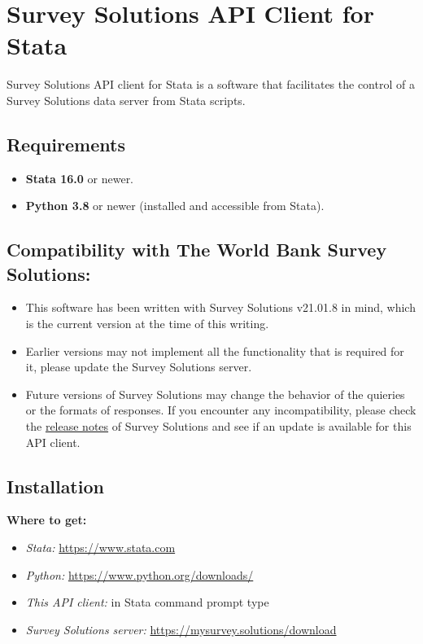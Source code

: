 \section{Survey Solutions API Client for Stata}

\vskip16pt
Survey Solutions API client for Stata is a software that facilitates the
control of a Survey Solutions data server from Stata scripts.

\vskip16pt
\subsection{Requirements}

\begin{itemize}
    \item \textbf{Stata 16.0} or newer.
    \item \textbf{Python 3.8} or newer (installed and accessible from Stata).
\end{itemize}

\vskip16pt
\subsection{Compatibility with The World Bank Survey Solutions:}
\begin{itemize}
  \item This software has been written with Survey Solutions v21.01.8 in mind,
        which is the current version at the time of this writing.
  \item Earlier versions may not implement all the functionality that is
        required for it, please update the Survey Solutions server.
  \item Future versions of Survey Solutions may change the behavior of the
        quieries or the formats of responses. If you encounter any
        incompatibility, please check the \href{https://docs.mysurvey.solutions/release_notes}{release notes} of Survey Solutions
        and see if an update is available for this API client.
\end{itemize}

\vskip16pt
\subsection{Installation}
\par
\vskip16pt
\textbf{Where to get:}\par
\begin{itemize}
  \item \textit{Stata:} \href{https://www.stata.com}{https://www.stata.com}
  \item \textit{Python:} \href{https://www.python.org/downloads/}{https://www.python.org/downloads/}
  \item \textit{This API client:} in Stata command prompt type 
  \item \textit{Survey Solutions server:} \href{https://mysurvey.solutions/download}{https://mysurvey.solutions/download}
\end{itemize}

